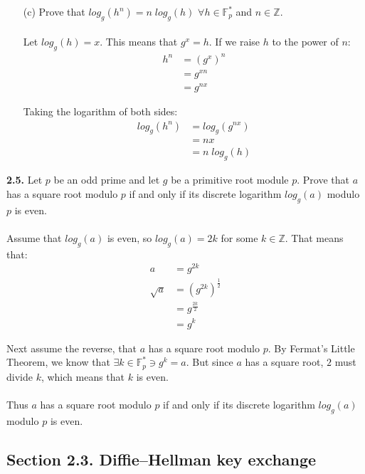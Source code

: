 \documentclass[11pt,fleqn]{article}
\newcommand{\Z}{\mathbb{Z}}
\newcommand{\F}{\mathbb{F}}
\begin{document}
\begin{itemize}
\item[(c)] Prove that $log_g (h^n) = n \; log_g (h)$ $\forall h \in \F_p^*$ and $n \in \Z$.\\
\\
  Let $log_g (h) = x$.  This means that $g^{x} = h$.  If we raise $h$ to the power of $n$:
\begin{align}
  h^n &= (g^{x})^n\nonumber\\
          &= g^{xn}\nonumber\\
          &= g^{nx}\nonumber
\end{align}

Taking the logarithm of both sides:
\begin{align}
  log_g (h^n) &= log_g (g^{nx})\nonumber\\
  &= nx\nonumber\\
  &= n\;log_g (h)\nonumber
\end{align}
  
\end{itemize}


\textbf{2.5.} Let $p$ be an odd prime and let $g$ be a primitive root module $p$.  Prove that $a$ has a square root modulo $p$ if and only if its discrete logarithm $log_g (a)$ modulo $p$ is even.\\
\\
Assume that $log_g (a)$ is even, so $log_g (a) = 2k$ for some $k \in \Z$.  That means that:
\begin{align}
  a &= g^{2k}\nonumber\\
  \sqrt{a} &= (g^{2k})^{\frac{1}{2}}\nonumber\\
  &= g^{\frac{2k}{2}}\nonumber\\
  &= g^k\nonumber
\end{align}

Next assume the reverse, that $a$ has a square root modulo $p$.  By Fermat's Little Theorem, we know that $\exists k \in \F_p^* \ni g^k = a$.  But since $a$ has a square root, $2$ must divide $k$, which means that $k$ is even.\\
\\
Thus $a$ has a square root modulo $p$ if and only if its discrete logarithm $log_g (a)$ modulo $p$ is even.

\subsection*{Section 2.3. Diffie–Hellman key exchange}
\end{document}
